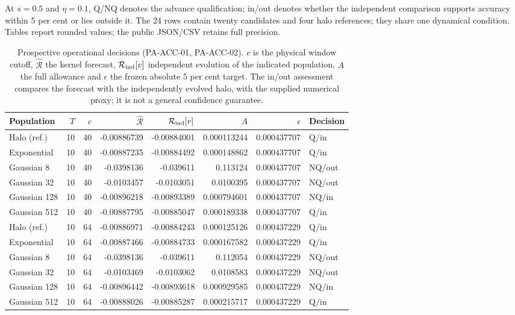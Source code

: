 \documentclass[fleqn,usenatbib]{mnras}
\begin{document}
At \(s=0.5\) and \(\eta=0.1\), Q/NQ denotes the advance qualification; in/out denotes whether the independent comparison supports accuracy within 5 per cent or lies outside it. The 24 rows contain twenty candidates and four halo references; they share one dynamical condition. Tables report rounded values; the public JSON/CSV retains full precision.

\begin{table}
\centering
\caption{Prospective operational decisions (PA-ACC-01, PA-ACC-02). $c$ is the physical window cutoff, $\widehat{\mathcal R}$ the kernel forecast, $\mathcal R_{\rm ind}[v]$ independent evolution of the indicated population, $A$ the full allowance and $\epsilon$ the frozen absolute 5 per cent target. The in/out assessment compares the forecast with the independently evolved halo, with the supplied numerical proxy; it is not a general confidence guarantee.}\label{tab-acc}
\small
\setlength{\tabcolsep}{4pt}
\begin{tabular}{lrrrrrrl}
\toprule
Population & $T$ & $c$ & $\widehat{\mathcal R}$ & $\mathcal R_{\rm ind}[v]$ & $A$ & $\epsilon$ & Decision \\
\midrule
Halo (ref.) & 10 & 40 & -0.00886739 & -0.00884001 & 0.000113244 & 0.000437707 & Q/in \\
Exponential & 10 & 40 & -0.00887235 & -0.00884492 & 0.000148862 & 0.000437707 & Q/in \\
Gaussian 8 & 10 & 40 & -0.0398136 & -0.039611 & 0.113124 & 0.000437707 & NQ/out \\
Gaussian 32 & 10 & 40 & -0.0103457 & -0.0103051 & 0.0100395 & 0.000437707 & NQ/out \\
Gaussian 128 & 10 & 40 & -0.00896218 & -0.00893389 & 0.000794601 & 0.000437707 & NQ/in \\
Gaussian 512 & 10 & 40 & -0.00887795 & -0.00885047 & 0.000189338 & 0.000437707 & Q/in \\
Halo (ref.) & 10 & 64 & -0.00886971 & -0.00884243 & 0.000125126 & 0.000437229 & Q/in \\
Exponential & 10 & 64 & -0.00887466 & -0.00884733 & 0.000167582 & 0.000437229 & Q/in \\
Gaussian 8 & 10 & 64 & -0.0398136 & -0.039611 & 0.112054 & 0.000437229 & NQ/out \\
Gaussian 32 & 10 & 64 & -0.0103469 & -0.0103062 & 0.0108583 & 0.000437229 & NQ/out \\
Gaussian 128 & 10 & 64 & -0.00896442 & -0.00893618 & 0.000929585 & 0.000437229 & NQ/in \\
Gaussian 512 & 10 & 64 & -0.00888026 & -0.00885287 & 0.000215717 & 0.000437229 & Q/in \\

\end{tabular}
\end{table}
\end{document}
